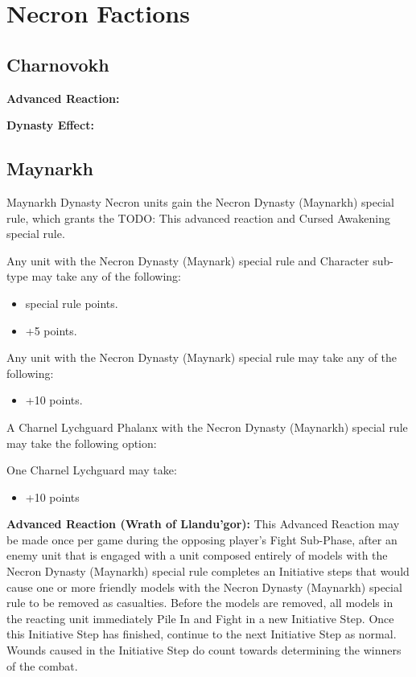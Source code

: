 \section{Necron Factions}

\begin{multicols}{2}
\newpage
\subsection{Charnovokh}

\textbf{Advanced Reaction:}

\textbf{Dynasty Effect:}


\newpage
\subsection{Maynarkh}

Maynarkh Dynasty Necron units gain the Necron Dynasty (Maynarkh) special rule, which grants the TODO: This advanced reaction and Cursed Awakening special rule. 

Any unit with the Necron Dynasty (Maynark) special rule and Character sub-type may take any of the following:
\begin{itemize}
	\item {} special rule  points.
	\item {} \dotfill +5 points.
\end{itemize}

Any unit with the Necron Dynasty (Maynark) special rule may take any of the following:
\begin{itemize}
	\item {} \dotfill +10 points.
\end{itemize}

A Charnel Lychguard Phalanx with the Necron Dynasty (Maynarkh) special rule may take the following option:

One Charnel Lychguard may take:
\begin{itemize}
	\item {} \dotfill +10 points
\end{itemize} 

\textbf{Advanced Reaction (Wrath of Llandu'gor):} This Advanced Reaction may be made once per game during the opposing player’s Fight Sub-Phase, after an enemy unit that is engaged with a unit composed entirely of models with the Necron Dynasty (Maynarkh) special rule completes an Initiative steps that would cause one or more friendly models with the Necron Dynasty (Maynarkh) special rule to be removed as casualties. Before the models are removed, all models in the reacting unit immediately Pile In and Fight in a new Initiative Step. Once this Initiative Step has finished, continue to the next Initiative Step as normal. Wounds caused in the Initiative Step do count towards determining the winners of the combat.


\end{multicols}

